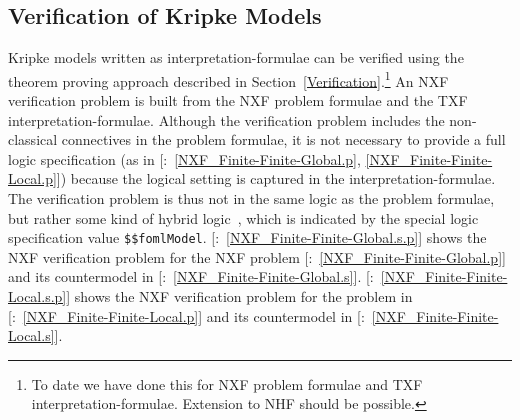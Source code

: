 \documentclass{ceurart}
\newcommand{\smalltt}[1]{\small \texttt{#1}}
\newcommand{\example}{{\scriptsize \faFile[regular]}}
\begin{document}
\subsection{Verification of Kripke Models}
\label{KripkeVerification}

Kripke models written as interpretation-formulae can be verified using the theorem proving 
approach described in Section~\ref{Verification}.\footnote{%
To date we have done this for NXF problem formulae and TXF interpretation-formulae. 
Extension to NHF should be possible.}
An NXF verification problem is built from the NXF problem formulae and the TXF 
interpretation-formulae.
Although the verification problem includes the non-classical connectives in the problem
formulae, it is not necessary to provide a full logic specification (as in 
[\example{}:~\ref{NXF_Finite-Finite-Global.p}, 
\ref{NXF_Finite-Finite-Local.p}]) because the logical setting is captured in 
the interpretation-formulae.
The verification problem is thus not in the same logic as the problem formulae, but rather
some kind of hybrid logic~\cite{Bra11}, which is indicated by the special logic specification
value \smalltt{\$\$fomlModel}.
[\example{}:~\ref{NXF_Finite-Finite-Global.s.p}] shows the NXF 
verification problem for the NXF problem
[\example{}:~\ref{NXF_Finite-Finite-Global.p}] and its countermodel 
in [\example{}:~\ref{NXF_Finite-Finite-Global.s}].
[\example{}:~\ref{NXF_Finite-Finite-Local.s.p}] shows the NXF 
verification problem for the problem in 
[\example{}:~\ref{NXF_Finite-Finite-Local.p}] and its countermodel in 
[\example{}:~\ref{NXF_Finite-Finite-Local.s}].
\end{document}
